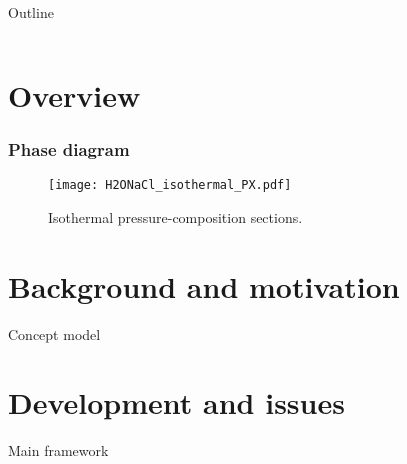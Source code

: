 \documentclass[aspectratio=169,compress]{beamer}
\begin{document}
	
    
    \setcounter{tocdepth}{1}
    \begin{frame}{Outline}
        \begin{columns}
            \begin{column}{0.1\textwidth}
            \end{column}
            \begin{column}{0.9\textwidth}
                \begin{spacing}{2}
                \tableofcontents
                \end{spacing}
            \end{column}
        \end{columns}
    \end{frame}
    
	\section{Overview}
	\begin{frame}
		\frametitle{Phase diagram}
	
		\begin{figure}
			\texttt{[image: H2ONaCl\_isothermal\_PX.pdf]}
			\caption{Isothermal pressure-composition sections.}
		\end{figure}
	
	\end{frame}

	\section{Background and motivation}
	\begin{frame}{Concept model}
	    
	\end{frame}
	
	\section{Development and issues}
	\begin{frame}{Main framework}
	    
	\end{frame}
	
	\begin{frame}{}
    \end{frame}
    
\end{document}
